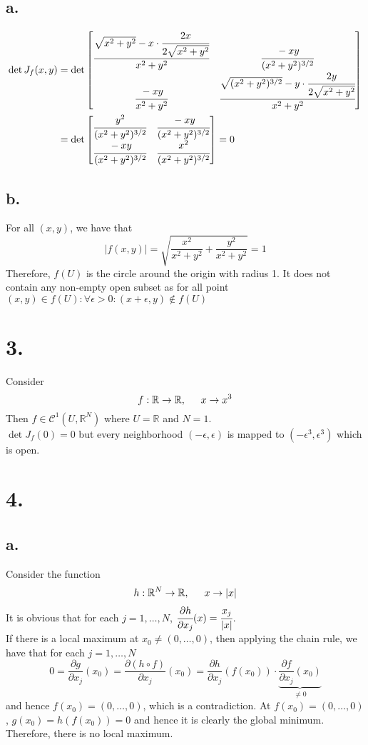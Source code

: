 \documentclass[11pt]{article}
\begin{document}
\subsection*{a.}
\begin{equation*}
    \begin{aligned}
        \det J_f(x,y) &= 
        \det 
        \begin{bmatrix}
            \cfrac{\sqrt{x^2+y^2} - x \cdot \cfrac{2x}{2\sqrt{x^2+y^2}}}{x^2+y^2} & \cfrac{-xy}{(x^2+y^2)^{3/2}}\\
            \cfrac{-xy}{x^2+y^2} & \cfrac{\sqrt{(x^2+y^2)^{3/2}} - y \cdot \cfrac{2y}{2\sqrt{x^2+y^2}}}{x^2+y^2}
        \end{bmatrix}  \\
        &=  
        \det 
        \begin{bmatrix}
            \cfrac{y^2}{(x^2+y^2)^{3/2}} & \cfrac{-xy}{(x^2+y^2)^{3/2}} \\
            \cfrac{-xy}{(x^2+y^2)^{3/2}} & \cfrac{x^2}{(x^2+y^2)^{3/2}}
        \end{bmatrix} 
        =0 \\
    \end{aligned}
\end{equation*}
\subsection*{b.}
For all $(x,y)$, we have that 
\[
    |f(x,y)| = \sqrt{\frac{x^2}{x^2 + y^2} + \frac{y^2}{x^2 + y^2}} = 1    
\]
Therefore, $f(U)$ is the circle around the origin with radius 1. It does not contain any non-empty open 
subset as for all point $(x,y) \in f(U): \forall \epsilon >0: (x+\epsilon, y) \notin f(U)$
\pagebreak
\section*{3.}
Consider 
\[
    f: \mathbb{R} \to \mathbb{R}, \indent x \to x^3
\]
Then $f \in \mathcal{C}^1(U,\mathbb{R}^N)$ where $U = \mathbb{R}$ and $N=1$. \\
$\det J_f(0) = 0$ but every neighborhood $(-\epsilon , \epsilon)$ is mapped to $(-\epsilon^3, \epsilon^3)$ which is open. 
\pagebreak
\section*{4.}
\subsection*{a.}
Consider the function 
\[
    h: \mathbb{R}^N \to \mathbb{R}, \indent x \to |x|    
\]
It is obvious that for each $j=1, \ldots ,N$, $\cfrac{\partial h}{\partial x_j}(x) = \cfrac{x_j}{|x|}$. \\
If there is a local maximum at $x_0 \ne (0,\ldots, 0)$, then applying the chain rule, we have that for each $j = 1, \ldots ,N$
\[
    0 = \frac{\partial g}{\partial x_j}(x_0) = 
    \frac{\partial (h \circ f)}{\partial x_j}(x_0) = \frac{\partial h}{\partial x_j}(f(x_0)) 
    \cdot \underbrace{\frac{\partial f}{\partial x_j}(x_0)}_{\ne 0}
\]
and hence $f(x_0) = (0,\ldots ,0)$, which is a contradiction. At $f(x_0) = (0,\ldots,0)$, 
$g(x_0)= h(f(x_0))=0$ and hence it is clearly the global minimum. Therefore, there is no local maximum.  
\end{document}
